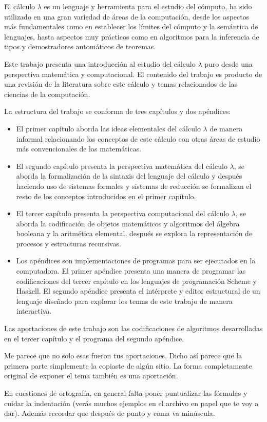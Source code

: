 El cálculo \( λ \) es un lenguaje y herramienta para el estudio del cómputo, ha sido utilizado en una gran variedad de áreas de la computación, desde los aspectos más fundamentales como en establecer los límites del cómputo y la semántica de lenguajes, hasta aspectos muy prácticos como en algoritmos para la inferencia de tipos y demostradores automáticos de teoremas.

Este trabajo presenta una introducción al estudio del cálculo \( λ \) puro desde una perspectiva matemática y computacional. El contenido del trabajo es producto de una revisión de la literatura sobre este cálculo y temas relacionados de las ciencias de la computación.

La estructura del trabajo se conforma de tres capítulos y dos apéndices:

\begin{itemize}
\item El primer capítulo aborda las ideas elementales del cálculo \( λ \) de manera informal relacionando los conceptos de este cálculo con otras áreas de estudio más convencionales de las matemáticas.

\item El segundo capítulo presenta la perspectiva matemática del cálculo \( λ \), se aborda la formalización de la sintaxis del lenguaje del cálculo y después haciendo uso de sistemas formales y sistemas de reducción se formalizan el resto de los conceptos introducidos en el primer capítulo.

\item El tercer capítulo presenta la perspectiva computacional del cálculo \( λ \), se aborda la codificación de objetos matemáticos y algoritmos del álgebra booleana y la aritmética elemental, después se explora la representación de procesos y estructuras recursivas.

\item Los apéndices son implementaciones de programas para ser ejecutados en la computadora. El primer apéndice presenta una manera de programar las codificaciones del tercer capítulo en los lenguajes de programación Scheme y Haskell. El segundo apéndice presenta el intérprete y editor estructural de un lenguaje diseñado para explorar los temas de este trabajo de manera interactiva.
\end{itemize}

Las aportaciones de este trabajo son las codificaciones de algoritmos desarrolladas en el tercer capítulo y el programa del segundo apéndice.
\begin{Gutu}
Me parece que no solo esas fueron tus aportaciones.  Dicho así parece que la primera parte simplemente la copiaste de algún sitio. La forma completamente original de exponer el tema también es una aportación.
\end{Gutu}

\begin{Gutu}
En cuestiones de ortografía, en general falta poner puntualizar las fórmulas y cuidar la indentación (verás muchos ejemplos en el archivo en papel que te voy a dar). Además recordar que después de punto y coma va minúscula.
\end{Gutu}